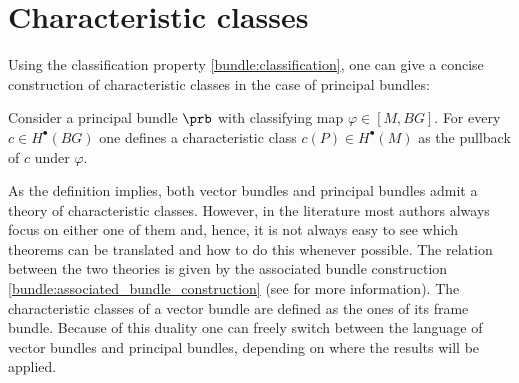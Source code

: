 \section{Characteristic classes}

    Using the classification property \ref{bundle:classification}, one can give a concise construction of characteristic classes in the case of principal bundles:
    \begin{construct}
        Consider a principal bundle $\prb$ with classifying map $\varphi\in[M,BG]$. For every $c\in H^\bullet(BG)$ one defines a characteristic class $c(P)\in H^\bullet(M)$ as the pullback of $c$ under $\varphi$.
    \end{construct}

    As the definition implies, both vector bundles and principal bundles admit a theory of characteristic classes. However, in the literature most authors always focus on either one of them and, hence, it is not always easy to see which theorems can be translated and how to do this whenever possible. The relation between the two theories is given by the associated bundle construction \ref{bundle:associated_bundle_construction} (see \cite{sorensen} for more information). The characteristic classes of a vector bundle are defined as the ones of its frame bundle. Because of this duality one can freely switch between the language of vector bundles and principal bundles, depending on where the results will be applied.

